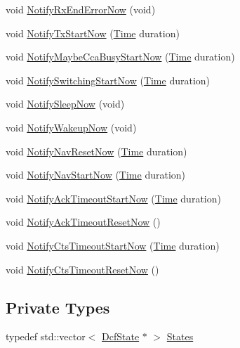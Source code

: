 \begin{DoxyCompactItemize}
\item 
void \hyperlink{classns3_1_1DcfManager_a88d31851aac378840f7be19edf4a8229}{Notify\+Rx\+End\+Error\+Now} (void)
\item 
void \hyperlink{classns3_1_1DcfManager_a2d033bea8553f14fd162e8a4217c5eef}{Notify\+Tx\+Start\+Now} (\hyperlink{classns3_1_1Time}{Time} duration)
\item 
void \hyperlink{classns3_1_1DcfManager_aeff15fe58b41785e1cefa90cafda085e}{Notify\+Maybe\+Cca\+Busy\+Start\+Now} (\hyperlink{classns3_1_1Time}{Time} duration)
\item 
void \hyperlink{classns3_1_1DcfManager_ad11be0f0397f13a3dd99054da1b234ed}{Notify\+Switching\+Start\+Now} (\hyperlink{classns3_1_1Time}{Time} duration)
\item 
void \hyperlink{classns3_1_1DcfManager_a88ee7fd811f8390b4045d68d116860d9}{Notify\+Sleep\+Now} (void)
\item 
void \hyperlink{classns3_1_1DcfManager_a6a47134f32caf4b02af6444435bc9197}{Notify\+Wakeup\+Now} (void)
\item 
void \hyperlink{classns3_1_1DcfManager_ac0d2e9acdfa5c64eb21c4a298f22072e}{Notify\+Nav\+Reset\+Now} (\hyperlink{classns3_1_1Time}{Time} duration)
\item 
void \hyperlink{classns3_1_1DcfManager_acc2c29c484980d070d562b3863fdf83a}{Notify\+Nav\+Start\+Now} (\hyperlink{classns3_1_1Time}{Time} duration)
\item 
void \hyperlink{classns3_1_1DcfManager_a596c0d24820263d08fe77d2cba946575}{Notify\+Ack\+Timeout\+Start\+Now} (\hyperlink{classns3_1_1Time}{Time} duration)
\item 
void \hyperlink{classns3_1_1DcfManager_a624956c19f741c5252ac47dad0d4a77b}{Notify\+Ack\+Timeout\+Reset\+Now} ()
\item 
void \hyperlink{classns3_1_1DcfManager_a11c2cef8d42ca21f3728695d78364471}{Notify\+Cts\+Timeout\+Start\+Now} (\hyperlink{classns3_1_1Time}{Time} duration)
\item 
void \hyperlink{classns3_1_1DcfManager_a586699dad4dda7586c06d155db9f099c}{Notify\+Cts\+Timeout\+Reset\+Now} ()
\end{DoxyCompactItemize}
\subsection*{Private Types}
\begin{DoxyCompactItemize}
\item 
typedef std\+::vector$<$ \hyperlink{classns3_1_1DcfState}{Dcf\+State} $\ast$ $>$ \hyperlink{classns3_1_1DcfManager_a1ccfb8ce052dc22c3dedcbcb4b51e005}{States}
\end{DoxyCompactItemize}
